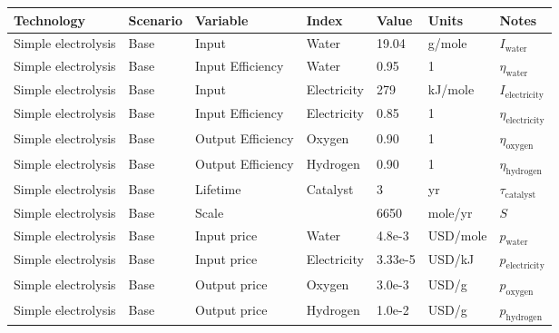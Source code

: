\documentclass[letterpaper,10pt,english]{sphinxmanual}
\begin{document}
\begin{savenotes}\sphinxattablestart
\centering
{}
\sphinxthecaptionisattop
{}\label{\detokenize{doc-src/database:table-2}}\label{\detokenize{doc-src/database:tbl-designs}}
\sphinxaftertopcaption
\begin{tabulary}{\linewidth}[t]{|T|T|T|T|T|T|T|}
\hline
\sphinxstyletheadfamily 
Technology
&\sphinxstyletheadfamily 
Scenario
&\sphinxstyletheadfamily 
Variable
&\sphinxstyletheadfamily 
Index
&\sphinxstyletheadfamily 
Value
&\sphinxstyletheadfamily 
Units
&\sphinxstyletheadfamily 
Notes
\\
\hline
Simple electrolysis
&
Base
&
Input
&
Water
&
19.04
&
g/mole
&
\(I_\mathrm{water}\)
\\
\hline
Simple electrolysis
&
Base
&
Input Efficiency
&
Water
&
0.95
&
1
&
\(\eta_\mathrm{water}\)
\\
\hline
Simple electrolysis
&
Base
&
Input
&
Electricity
&
279
&
kJ/mole
&
\(I_\mathrm{electricity}\)
\\
\hline
Simple electrolysis
&
Base
&
Input Efficiency
&
Electricity
&
0.85
&
1
&
\(\eta_\mathrm{electricity}\)
\\
\hline
Simple electrolysis
&
Base
&
Output Efficiency
&
Oxygen
&
0.90
&
1
&
\(\eta_\mathrm{oxygen}\)
\\
\hline
Simple electrolysis
&
Base
&
Output Efficiency
&
Hydrogen
&
0.90
&
1
&
\(\eta_\mathrm{hydrogen}\)
\\
\hline
Simple electrolysis
&
Base
&
Lifetime
&
Catalyst
&
3
&
yr
&
\(\tau_\mathrm{catalyst}\)
\\
\hline
Simple electrolysis
&
Base
&
Scale
&&
6650
&
mole/yr
&
\(S\)
\\
\hline
Simple electrolysis
&
Base
&
Input price
&
Water
&
4.8e-3
&
USD/mole
&
\(p_\mathrm{water}\)
\\
\hline
Simple electrolysis
&
Base
&
Input price
&
Electricity
&
3.33e-5
&
USD/kJ
&
\(p_\mathrm{electricity}\)
\\
\hline
Simple electrolysis
&
Base
&
Output price
&
Oxygen
&
3.0e-3
&
USD/g
&
\(p_\mathrm{oxygen}\)
\\
\hline
Simple electrolysis
&
Base
&
Output price
&
Hydrogen
&
1.0e-2
&
USD/g
&
\(p_\mathrm{hydrogen}\)
\\
\hline
\end{tabulary}
\par
\sphinxattableend\end{savenotes}
\end{document}
